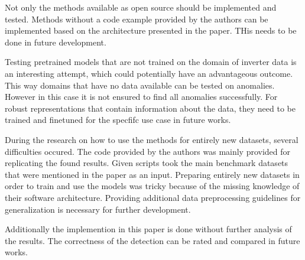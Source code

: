 Not only the methods available as open source should be implemented and tested. Methods without a code example provided by the authors can be implemented based on the architecture presented in the paper. THis needs to be done in future development.

Testing pretrained models that are not trained on the domain of inverter data is an interesting attempt, which could potentially have an advantageous outcome. This way domains that have no data available can be tested on anomalies. However in this case it is not ensured to find all anomalies successfully. For robust representations that contain information about the data, they need to be trained and finetuned for the specfifc use case in future works.

During the research on how to use the methods for entirely new datasets, several difficulties occured. The code provided by the authors was mainly provided for replicating the found results. Given scripts took the main benchmark datasets that were mentioned in the paper as an input. Preparing entirely new datasets in order to train and use the models was tricky because of the missing knowledge of their software architecture. Providing additional data preprocessing guidelines for generalization is necessary for further development.

Additionally the implemention in this paper is done without further analysis of the results. The correctness of the detection can be rated and compared in future works.
